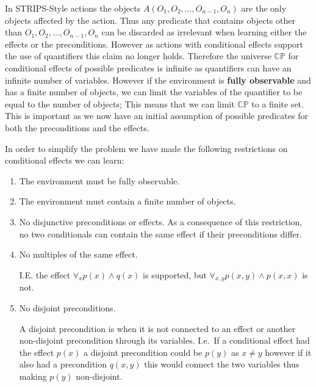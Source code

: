 \documentclass[../Master.tex]{subfiles}
\begin{document}
In STRIPS-Style actions the objects $A(O_1,O_2,\ldots,O_{n-1},O_n)$ are the only objects affected by the action.
Thus any predicate that contains objects other than $O_1,O_2,\ldots,O_{n-1},O_n$ can be discarded as irrelevant when learning either the effects or the preconditions.
However as actions with conditional effects support the use of quantifiers this claim no longer holds.
Therefore the universe $\mathbb{CP}$ for conditional effects of possible predicates is infinite as quantifiers can have an infinite number of variables.
However if the environment is \textbf{fully observable} and has a finite number of objects,
we can limit the variables of the quantifier to be equal to the number of objects; This means that we can limit $\mathbb{CP}$ to a finite set.
This is important as we now have an initial assumption of possible predicates for both the preconditions and the effects.

In order to simplify the problem we have made the following restrictions on conditional effects we can learn:
\begin{enumerate}[label=R.\arabic*]
	\item The environment must be fully observable.
	\item The environment must contain a finite number of objects.
	\item \label{rst:ca:no-disjuntive-conditionals} No disjunctive preconditions or effects. As a consequence of this restriction, no two conditionals can contain the same effect if their preconditions differ.
	\item \label{rst:ca:no-multiple-effect} No multiples of the same effect.

		  I.E. the effect $\forall_x p(x) \land q(x)$ is supported, but $\forall_{x, y} p(x, y) \land p(x, x) $ is not.

	\item \label{rst:ca:no-disjoint-preconditions} No disjoint preconditions.

		  A disjoint precondition is when it is not connected to an effect or another non-disjoint precondition through its variables.
		  I.e.\ If a conditional effect had the effect $p(x)$ a disjoint precondition could be $p(y)$ as $x \neq y$ however if it also had a precondition $q(x,y)$ this would connect the two variables thus making $p(y)$ non-disjoint.
\end{enumerate}
\end{document}
